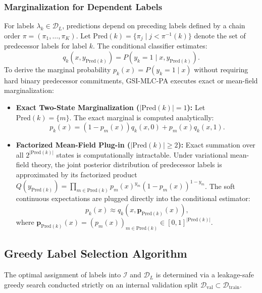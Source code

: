 \documentclass[conference]{IEEEtran}
\begin{document}
\subsubsection{Marginalization for Dependent Labels}
For labels $\lambda_k \in \mathcal{D}_L$, predictions depend on preceding labels defined by a chain order $\pi = (\pi_1, \dots, \pi_K)$. Let $\text{Pred}(k) = \{\pi_j \mid j < \pi^{-1}(k)\}$ denote the set of predecessor labels for label $k$. The conditional classifier estimates:
\begin{equation}
    q_k(x, y_{\text{Pred}(k)}) = P(y_k = 1 \mid x, y_{\text{Pred}(k)}).
\end{equation}
To derive the marginal probability $p_k(x) = P(y_k = 1 \mid x)$ without requiring hard binary predecessor commitments, GSI-MLC-PA executes exact or mean-field marginalization:
\begin{itemize}
    \item \textbf{Exact Two-State Marginalization ($|\text{Pred}(k)| = 1$):} Let $\text{Pred}(k) = \{m\}$. The exact marginal is computed analytically:
    \begin{equation}
        p_k(x) = (1 - p_m(x)) q_k(x, 0) + p_m(x) q_k(x, 1).
    \end{equation}
    \item \textbf{Factorized Mean-Field Plug-in ($|\text{Pred}(k)| \ge 2$):} Exact summation over all $2^{|\text{Pred}(k)|}$ states is computationally intractable. Under variational mean-field theory, the joint posterior distribution of predecessor labels is approximated by its factorized product $Q(y_{\text{Pred}(k)}) = \prod_{m \in \text{Pred}(k)} p_m(x)^{y_m} (1 - p_m(x))^{1 - y_m}$. The soft continuous expectations are plugged directly into the conditional estimator:
    \begin{equation}
        p_k(x) \approx q_k\left(x, \mathbf{p}_{\text{Pred}(k)}(x)\right),
    \end{equation}
    where $\mathbf{p}_{\text{Pred}(k)}(x) = \left(p_m(x)\right)_{m \in \text{Pred}(k)} \in [0, 1]^{|\text{Pred}(k)|}$.
\end{itemize}

\subsection{Greedy Label Selection Algorithm}
The optimal assignment of labels into $\mathcal{I}$ and $\mathcal{D}_L$ is determined via a leakage-safe greedy search conducted strictly on an internal validation split $\mathcal{D}_{\text{val}} \subset \mathcal{D}_{\text{train}}$. 
\end{document}
